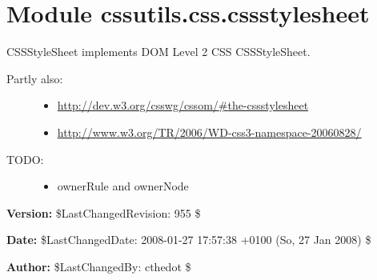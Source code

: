 %
%
%


\section{Module cssutils.css.cssstylesheet}

    \label{cssutils:css:cssstylesheet}

CSSStyleSheet implements DOM Level 2 CSS CSSStyleSheet.
\begin{description}
\item[{Partly also:}] \leavevmode \begin{itemize}
\item {} 
\href{http://dev.w3.org/csswg/cssom/\#the-cssstylesheet}{http://dev.w3.org/csswg/cssom/{\#}the-cssstylesheet}

\item {} 
\href{http://www.w3.org/TR/2006/WD-css3-namespace-20060828/}{http://www.w3.org/TR/2006/WD-css3-namespace-20060828/}

\end{itemize}

\item[{TODO:}] \leavevmode \begin{itemize}
\item {} 
ownerRule and ownerNode

\end{itemize}

\end{description}
\textbf{Version:} \$LastChangedRevision: 955 \$



\textbf{Date:} \$LastChangedDate: 2008-01-27 17:57:38 +0100 (So, 27 Jan 2008) \$



\textbf{Author:} \$LastChangedBy: cthedot \$





